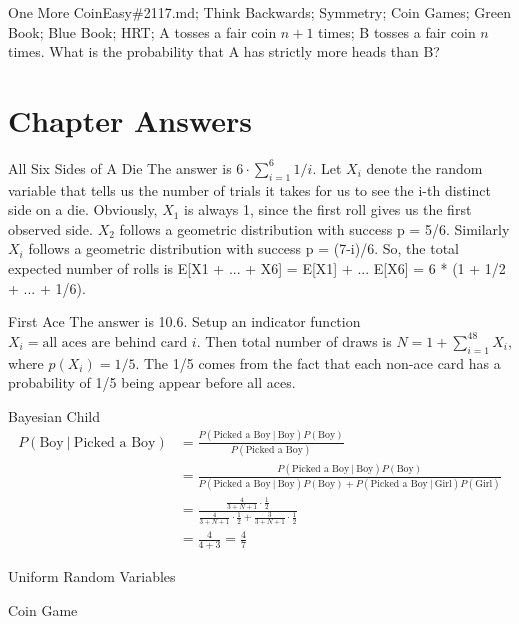 \documentclass[oldfontcommands]{memoir}
\begin{document}
{\begin{question}{One More Coin}{Easy}{\#2117.md; Think Backwards; Symmetry; Coin Games; Green Book; Blue Book; HRT;}
A tosses a fair coin $n+1$ times; B tosses a fair coin $n$ times. What is the probability that A has strictly more heads than B?

\end{question}

\newpage\section{Chapter Answers}\begin{answer}{All Six Sides of A Die}
The answer is $6 \cdot \sum_{i=1}^6 1/i$. Let $X_i$ denote the random variable that tells us the number of trials it takes for us to see the i-th distinct side on a die. Obviously, $X_1$ is always 1, since the first roll gives us the first observed side. $X_2$ follows a geometric distribution with success p = 5/6. Similarly $X_i$ follows a geometric distribution with success p = (7-i)/6. So, the total expected number of rolls is E[X1 + ... + X6] = E[X1] + ... E[X6] = 6 * (1 + 1/2 + ... + 1/6).\end{answer}
\begin{answer}{First Ace}
The answer is 10.6. Setup an indicator function $X_i = \mbox{all aces are behind card } i$. Then total number of draws is $N = 1 + \sum_{i=1}^48 X_i$, where $p(X_i) = 1/5$. The 1/5 comes from the fact that each non-ace card has a probability of 1/5 being appear before all aces.\end{answer}
\begin{answer}{Bayesian Child}
\begin{align}
	P(\text{Boy} ~|~ \text{Picked a Boy}) &= \frac{P(\text{Picked a Boy} ~|~ \text{Boy})P(\text{Boy})}{P(\text{Picked a Boy})}\\
	 &= \frac{P(\text{Picked a Boy} ~|~ \text{Boy})P(\text{Boy})}{P(\text{Picked a Boy} ~|~ \text{Boy})P(\text{Boy}) + P(\text{Picked a Boy} ~|~ \text{Girl})P(\text{Girl})}\\
	 &= \frac{\frac{4}{3+N+1} \cdot \frac{1}{2}}{\frac{4}{3+N+1} \cdot \frac{1}{2} + \frac{3}{3+N+1} \cdot \frac{1}{2}}\\
	 &= \frac{4}{4+3} = \frac{4}{7}
\end{align}\end{answer}
\begin{answer}{Uniform Random Variables}
\end{answer}
\begin{answer}{Coin Game}

\end{answer}}
\end{document}

